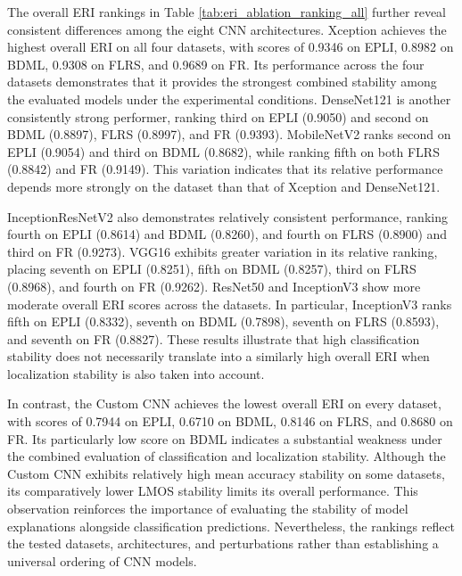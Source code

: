 \documentclass[a4paper,fleqn]{cas-dc}
\begin{document}
The overall ERI rankings in Table \ref{tab:eri_ablation_ranking_all} further reveal consistent differences among the eight CNN architectures. Xception achieves the highest overall ERI on all four datasets, with scores of 0.9346 on EPLI, 0.8982 on BDML, 0.9308 on FLRS, and 0.9689 on FR. Its performance across the four datasets demonstrates that it provides the strongest combined stability among the evaluated models under the experimental conditions. DenseNet121 is another consistently strong performer, ranking third on EPLI (0.9050) and second on BDML (0.8897), FLRS (0.8997), and FR (0.9393). MobileNetV2 ranks second on EPLI (0.9054) and third on BDML (0.8682), while ranking fifth on both FLRS (0.8842) and FR (0.9149). This variation indicates that its relative performance depends more strongly on the dataset than that of Xception and DenseNet121.

InceptionResNetV2 also demonstrates relatively consistent performance, ranking fourth on EPLI (0.8614) and BDML (0.8260), and fourth on FLRS (0.8900) and third on FR (0.9273). VGG16 exhibits greater variation in its relative ranking, placing seventh on EPLI (0.8251), fifth on BDML (0.8257), third on FLRS (0.8968), and fourth on FR (0.9262). ResNet50 and InceptionV3 show more moderate overall ERI scores across the datasets. In particular, InceptionV3 ranks fifth on EPLI (0.8332), seventh on BDML (0.7898), seventh on FLRS (0.8593), and seventh on FR (0.8827). These results illustrate that high classification stability does not necessarily translate into a similarly high overall ERI when localization stability is also taken into account.

In contrast, the Custom CNN achieves the lowest overall ERI on every dataset, with scores of 0.7944 on EPLI, 0.6710 on BDML, 0.8146 on FLRS, and 0.8680 on FR. Its particularly low score on BDML indicates a substantial weakness under the combined evaluation of classification and localization stability. Although the Custom CNN exhibits relatively high mean accuracy stability on some datasets, its comparatively lower LMOS stability limits its overall performance. This observation reinforces the importance of evaluating the stability of model explanations alongside classification predictions. Nevertheless, the rankings reflect the tested datasets, architectures, and perturbations rather than establishing a universal ordering of CNN models.
\end{document}
